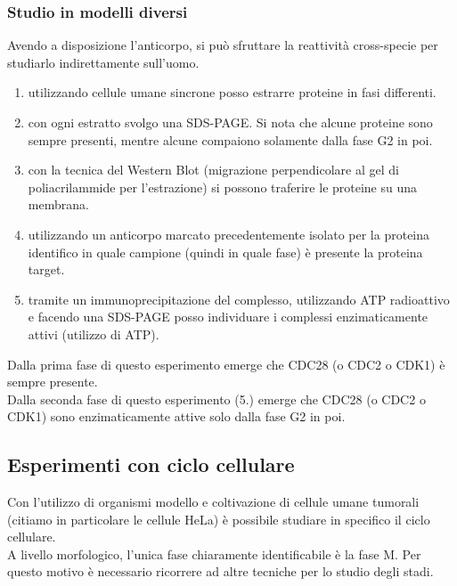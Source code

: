         \subsubsection{Studio in modelli diversi}
            Avendo a disposizione l'anticorpo, si può sfruttare la reattività cross-specie per studiarlo indirettamente sull'uomo.
            \begin{enumerate}
                \item utilizzando cellule umane sincrone posso estrarre proteine in fasi differenti.
                \item con ogni estratto svolgo una SDS-PAGE. Si nota che alcune proteine sono sempre presenti, mentre alcune compaiono solamente dalla fase G2 in poi.
                \item con la tecnica del Western Blot (migrazione perpendicolare al gel di poliacrilammide per l'estrazione) si possono traferire le proteine su una membrana.
                \item utilizzando un anticorpo marcato precedentemente isolato per la proteina identifico in quale campione (quindi in quale fase) è presente la proteina target.
                \item tramite un immunoprecipitazione del complesso, utilizzando ATP radioattivo e facendo una SDS-PAGE posso individuare i complessi enzimaticamente attivi (utilizzo di ATP).
                \end{enumerate}
            Dalla prima fase di questo esperimento emerge che CDC28 (o CDC2 o CDK1) è sempre presente.\\
            Dalla seconda fase di questo esperimento (5.) emerge che CDC28 (o CDC2 o CDK1) sono enzimaticamente attive solo dalla fase G2 in poi. 
        
    \subsection{Esperimenti con ciclo cellulare}
        Con l'utilizzo di organismi modello e coltivazione di cellule umane tumorali (citiamo in particolare le cellule HeLa) è possibile studiare in specifico il ciclo cellulare.\\
        A livello morfologico, l'unica fase chiaramente identificabile è la fase M. Per questo motivo è necessario ricorrere ad altre tecniche per lo studio degli stadi.
            
